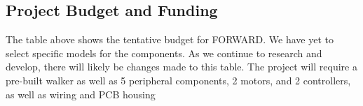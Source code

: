 \subsection{Project Budget and Funding}

\indent The table above shows the tentative budget for FORWARD. We have yet to select specific models for the components. As we continue to research and develop, there will likely be changes made to this table. The project will require a pre-built walker as well as 5 peripheral components, 2 motors, and 2 controllers, as well as wiring and PCB housing